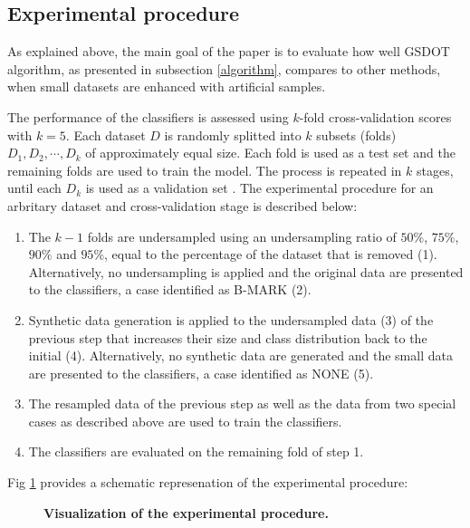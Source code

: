 \documentclass[10pt,letterpaper]{article}
\begin{document}
\subsection{Experimental procedure}
\label{experimental}

As explained above, the main goal of the paper is to evaluate how well GSDOT algorithm, as presented in subsection \ref{algorithm}, compares to other methods, when small datasets are enhanced with artificial samples.

The performance of the classifiers is assessed using \(k \)-fold cross-validation scores with \( k = 5 \). Each dataset \( D \) is randomly splitted into \( k \) subsets (folds) \( D_1, D_2, \cdots, D_k \) of approximately equal size. Each fold is used as a test set and the remaining folds are used to train the model. The process is repeated in \( k \) stages, until each \( D_k \) is used as a validation set \cite{Han.2012}. The experimental procedure for an arbritary dataset and cross-validation stage is described below:

\begin{enumerate}

	\item The \( k - 1 \) folds are undersampled using an undersampling ratio
	of $50\%$, $75\%$, $90\%$ and $95\%$, equal to the percentage of the dataset that is removed (1). Alternatively, no undersampling is applied and the original data are presented to the classifiers, a case identified as B-MARK (2).

	\item Synthetic data generation is applied to the undersampled data (3) of the previous
	step that increases their size and class distribution back to the initial (4). Alternatively, no synthetic data are generated and the small data are presented to the classifiers, a case identified as NONE (5).

	\item The resampled data of the previous step as well as the data from two special cases as described above are used to train the classifiers.
	
	\item The classifiers are evaluated on the remaining fold of step 1.

\end{enumerate}

 Fig \ref{fig:experimentalprocedure} provides a schematic represenation of the experimental procedure: 

 \begin{figure}[!h]
	\centering
	\caption{\bf Visualization of the experimental procedure.}
	\label{fig:experimentalprocedure}
\end{figure}
\end{document}
